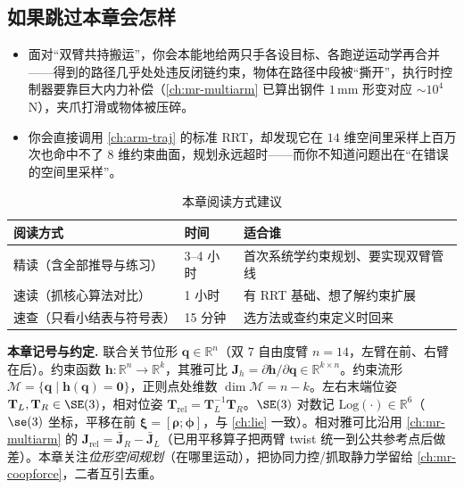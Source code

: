 \subsection*{如果跳过本章会怎样}
\begin{itemize}
  \item 面对“双臂共持搬运”，你会本能地给两只手各设目标、各跑逆运动学再合并——得到的路径几乎处处违反闭链约束，物体在路径中段被“撕开”，执行时控制器要靠巨大内力补偿（\cref{ch:mr-multiarm} 已算出钢件 $1$\,mm 形变对应 $\sim10^4$\,N），夹爪打滑或物体被压碎。
  \item 你会直接调用 \cref{ch:arm-traj} 的标准 RRT，却发现它在 $14$ 维空间里采样上百万次也命中不了 $8$ 维约束曲面，规划永远超时——而你不知道问题出在“在错误的空间里采样”。
\end{itemize}

\begin{table}[H]\centering\small
\caption{本章阅读方式建议}
\begin{tabular}{lll}
\toprule
阅读方式 & 时间 & 适合谁 \\
\midrule
精读（含全部推导与练习） & 3--4 小时 & 首次系统学约束规划、要实现双臂管线 \\
速读（抓核心算法对比） & 1 小时 & 有 RRT 基础、想了解约束扩展 \\
速查（只看小结表与符号表） & 15 分钟 & 选方法或查约束定义时回来 \\
\bottomrule
\end{tabular}
\end{table}

\begin{note}
\textbf{本章记号与约定.}\;
联合关节位形 $\mathbf{q}\in\mathbb{R}^{n}$（双 $7$ 自由度臂 $n=14$，左臂在前、右臂在后）。约束函数 $\mathbf{h}:\mathbb{R}^{n}\to\mathbb{R}^{k}$，其雅可比 $\mathbf{J}_h=\partial\mathbf{h}/\partial\mathbf{q}\in\mathbb{R}^{k\times n}$。约束流形 $\mathcal{M}=\{\mathbf{q}\mid\mathbf{h}(\mathbf{q})=\mathbf{0}\}$，正则点处维数 $\dim\mathcal{M}=n-k$。左右末端位姿 $\mathbf{T}_L,\mathbf{T}_R\in\SE(3)$，相对位姿 $\mathbf{T}_{\text{rel}}=\mathbf{T}_L^{-1}\mathbf{T}_R$。$\SE(3)$ 对数记 $\mathrm{Log}(\cdot)\in\mathbb{R}^6$（$\se(3)$ 坐标，平移在前 $\boldsymbol{\xi}=[\boldsymbol{\rho};\boldsymbol{\phi}]$，与 \cref{ch:lie} 一致）。相对雅可比沿用 \cref{ch:mr-multiarm} 的 $\mathbf{J}_{\text{rel}}=\bar{\mathbf{J}}_R-\bar{\mathbf{J}}_L$（已用平移算子把两臂 twist 统一到公共参考点后做差）。本章关注\emph{位形空间规划}（在哪里运动），把协同力控/抓取静力学留给 \cref{ch:mr-coopforce}，二者互引去重。
\end{note}

